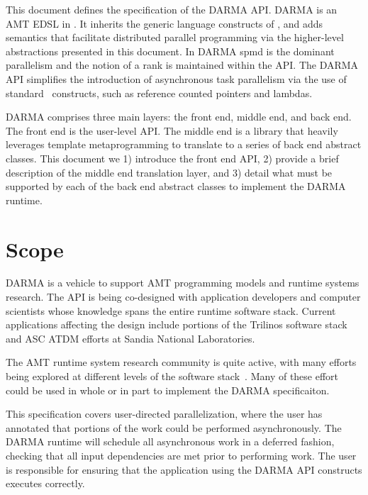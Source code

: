 This document defines the specification of the DARMA \gls{API}.
DARMA is an \gls{AMT} \gls{EDSL} in \CC.
It inherits the generic language constructs of \CC, and adds 
\gls{semantics} that facilitate distributed parallel programming via the
higher-level abstractions presented in this document.   
In DARMA \gls{spmd} is the dominant parallelism and the notion of a \gls{rank}
is maintained within the \gls{API}.   
  The DARMA \gls{API} simplifies the introduction
  of asynchronous task parallelism via the use of standard \CC\ constructs, such
  as \gls{reference counted pointers} and \glspl{lambda}.



DARMA comprises three main layers: the \gls{front end}, \gls{middle end}, and
\gls{back end}.  The \gls{front end} is the user-level \gls{API}.  The
\gls{middle end} is a library that heavily leverages \CC \gls{template metaprogramming} 
to translate to a series of \gls{back end} abstract classes.
This document we 1) introduce the \gls{front end} \gls{API}, 2) provide a brief
description of the \gls{middle end} translation layer, and 3) detail what must be
supported by each of the \gls{back end} abstract classes to implement the DARMA runtime.



\section{Scope}
\label{sec:scope}
DARMA is a vehicle to support AMT programming models and runtime
systems research.  The \gls{API} is being \gls{co-design}ed with application developers
and computer scientists whose knowledge spans the entire runtime software stack.
Current applications affecting the design include portions of the \gls{Trilinos} software stack
and \gls{ASC} \gls{ATDM} efforts at Sandia National Laboratories. 
 

The \gls{AMT} \gls{runtime system} research community is quite active, with many efforts being
explored at different levels of the software stack~\cite{OCR,STAPL,Legion,StencilHPX,Charm++,Uintah, Loci}. 
Many of these effort could be used in whole or in part to implement the DARMA
specificaiton.

This specification covers user-directed parallelization, where the user
has annotated that portions of the work could be performed asynchronously.
The DARMA runtime will schedule all asynchronous work in a \gls{deferred} fashion,
checking that all \gls{input dependencies} are met prior to performing work.  
The user is responsible for ensuring that the application using the DARMA
\gls{API} constructs executes correctly.


